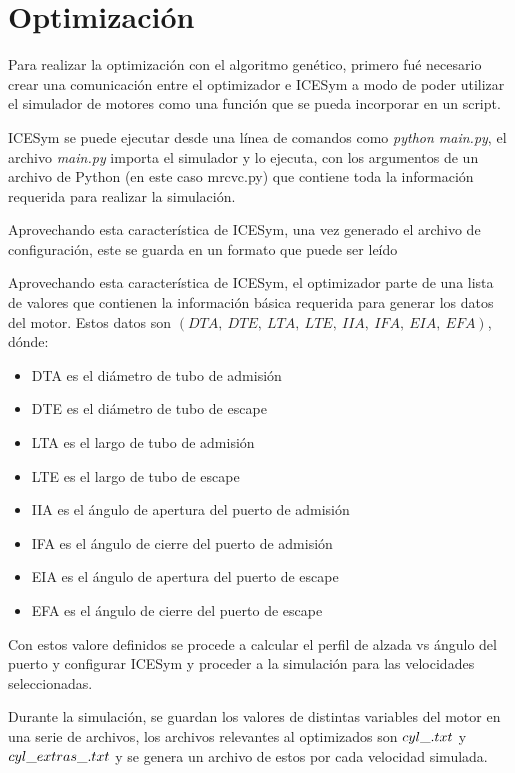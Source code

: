 \chapter{Optimización}

Para realizar la optimización con el algoritmo genético, primero fué necesario
crear una comunicación entre el optimizador e ICESym a modo de poder utilizar
el simulador de motores como una función que se pueda incorporar en un script.

ICESym se puede ejecutar desde una línea de comandos como \emph{python
main.py}, el archivo \emph{main.py} importa el simulador y lo ejecuta, con los
argumentos de un archivo de Python (en este caso mrcvc.py) que contiene toda la
información requerida para realizar la simulación.

Aprovechando esta característica de ICESym, una vez generado el archivo de
configuración, este se guarda en un formato que puede ser leído

Aprovechando esta característica de ICESym, el optimizador parte de una lista de
valores que contienen la información básica requerida para generar los datos del
motor.
%
Estos datos son \emph{$(DTA,\ DTE,\ LTA,\ LTE,\ IIA,\ IFA,\ EIA,\ EFA)$}, dónde:
%
\begin{itemize}
    \item DTA es el diámetro de tubo de admisión
    \item DTE es el diámetro de tubo de escape
    \item LTA es el largo de tubo de admisión
    \item LTE es el largo de tubo de escape
    \item IIA es el ángulo de apertura del puerto de admisión
    \item IFA es el ángulo de cierre del puerto de admisión
    \item EIA es el ángulo de apertura del puerto de escape
    \item EFA es el ángulo de cierre del puerto de escape
\end{itemize}
%

Con estos valore definidos se procede a calcular el perfil de alzada vs ángulo
del puerto y configurar ICESym y proceder a la simulación para las velocidades seleccionadas.

Durante la simulación, se guardan los valores de distintas variables del motor
en una serie de archivos, los archivos relevantes al optimizados son
\emph{$cyl\_\*.txt$} y \emph{$cyl\_extras\_\*.txt$} y se genera un archivo de estos por
cada velocidad simulada.


